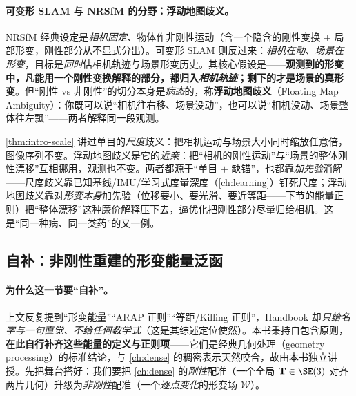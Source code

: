 \paragraph{可变形 SLAM 与 NRSfM 的分野：浮动地图歧义。}
NRSfM 经典设定是\emph{相机固定}、物体作非刚性运动（含一个隐含的刚性变换 $+$ 局部形变，刚性部分从不显式分出）。可变形 SLAM 则反过来：\emph{相机在动、场景在形变}，目标是\emph{同时}估相机轨迹与场景形变历史。其核心假设是——\textbf{观测到的形变中，凡能用一个刚性变换解释的部分，都归入\emph{相机轨迹}；剩下的才是场景的真形变}\cite{schmid2026dynamic}。但“刚性 vs 非刚性”的切分本身是\emph{病态}的，称\textbf{浮动地图歧义}（Floating Map Ambiguity）：你既可以说“相机往右移、场景没动”，也可以说“相机没动、场景整体往左飘”——两者解释同一段观测。

\begin{insight}[浮动地图歧义 $=$ 尺度歧义的“非刚性版”]
\cref{thm:intro-scale} 讲过单目的\emph{尺度}歧义：把相机运动与场景大小同时缩放任意倍，图像序列不变。浮动地图歧义是它的\emph{近亲}：把“相机的刚性运动”与“场景的整体刚性漂移”互相挪用，观测也不变。两者都源于“单目 $+$ 缺锚”，也都靠\emph{加先验}消解——尺度歧义靠已知基线/IMU/学习式度量深度（\cref{ch:learning}）钉死尺度；浮动地图歧义靠对\emph{形变本身}加先验（位移要小、要光滑、要近等距——下节的能量正则）把“整体漂移”这种廉价解释压下去，逼优化把刚性部分尽量归给相机。这是“同一种病、同一类药”的又一例。
\end{insight}

\subsection{自补：非刚性重建的形变能量泛函}
\label{sec:dynamic-energy}

\paragraph{为什么这一节要“自补”。}
上文反复提到“形变能量”“ARAP 正则”“等距/Killing 正则”，Handbook 却\emph{只给名字与一句直觉、不给任何数学式}（这是其综述定位使然）。本书秉持自包含原则，\textbf{在此自行补齐这些能量的定义与正则项}——它们是经典几何处理（geometry processing）的标准结论，与 \cref{ch:dense} 的稠密表示天然咬合，故由本书独立讲授。先把舞台搭好：我们要把 \cref{ch:dense} 的\emph{刚性}配准（一个全局 $\mathbf{T}\in\SE(3)$ 对齐两片几何）升级为\emph{非刚性}配准（一个\emph{逐点变化}的形变场 $\mathcal{W}$）。

